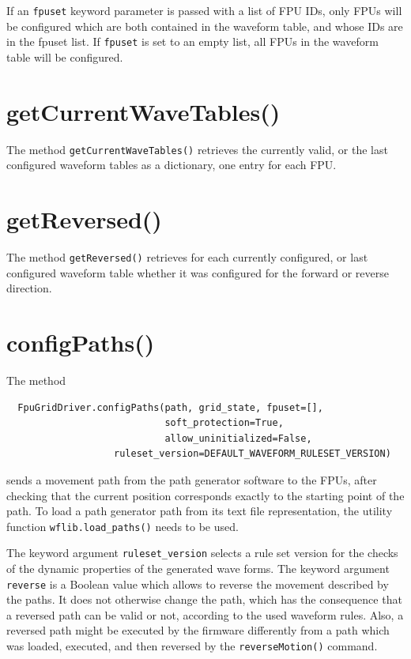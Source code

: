 \documentclass[fontsize=12,a4paper]{scrreprt}
\begin{document}
If an \texttt{fpuset} keyword parameter is passed with a list of FPU
IDs, only FPUs will be configured which are both contained in the
waveform table, and whose IDs are in the fpuset list. If
\texttt{fpuset} is set to an empty list, all FPUs in the waveform
table will be configured.


\section{getCurrentWaveTables()}
 The method
\texttt{getCurrentWaveTables()} retrieves the currently valid, or the
last configured waveform tables as a dictionary, one entry for each
FPU.


\section{getReversed()}
 The method \texttt{getReversed()}
retrieves for each currently configured, or last configured waveform
table whether it was configured for the forward or reverse direction.


\section{configPaths()}
\label{sec:configpaths}

The method
\begin{verbatim}
  FpuGridDriver.configPaths(path, grid_state, fpuset=[],
                            soft_protection=True,
                            allow_uninitialized=False,
                   ruleset_version=DEFAULT_WAVEFORM_RULESET_VERSION)
\end{verbatim}
sends a movement path from the path generator software to the FPUs,
after checking that the current position corresponds exactly to the
starting point of the path.  To load a path generator path from its
text file representation, the utility function
\texttt{wflib.load\_paths()} needs to be used.

The keyword argument \texttt{ruleset\_version} selects a rule set
version for the checks of the dynamic properties of the generated wave
forms. The keyword argument \texttt{reverse} is a Boolean value which
allows to reverse the movement described by the paths. It does not
otherwise change the path, which has the consequence that a reversed
path can be valid or not, according to the used waveform rules. Also,
a reversed path might be executed by the firmware differently from a
path which was loaded, executed, and then reversed by the
\texttt{reverseMotion()} command.
\end{document}
